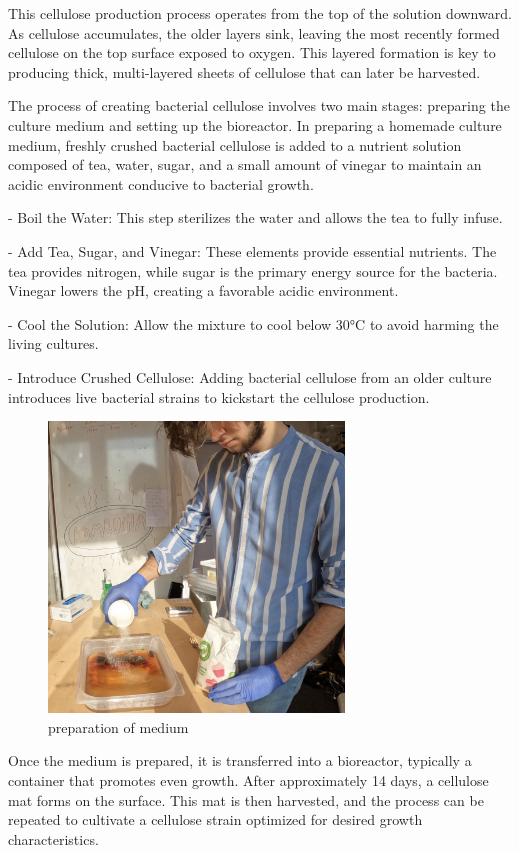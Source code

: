 This cellulose production process operates from the top of the solution downward. As cellulose accumulates, the older layers sink, leaving the most recently formed cellulose on the top surface exposed to oxygen. This layered formation is key to producing thick, multi-layered sheets of cellulose that can later be harvested.

The process of creating bacterial cellulose involves two main stages: preparing the culture medium and setting up the bioreactor. In preparing a homemade culture medium, freshly crushed bacterial cellulose is added to a nutrient solution composed of tea, water, sugar, and a small amount of vinegar to maintain an acidic environment conducive to bacterial growth.

\-- Boil the Water: This step sterilizes the water and allows the tea to fully infuse.

\-- Add Tea, Sugar, and Vinegar: These elements provide essential nutrients. The tea provides nitrogen, while sugar is the primary energy source for the bacteria. Vinegar lowers the pH, creating a favorable acidic environment.

\-- Cool the Solution: Allow the mixture to cool below 30°C to avoid harming the living cultures.

\-- Introduce Crushed Cellulose: Adding bacterial cellulose from an older culture introduces live bacterial strains to kickstart the cellulose production.

\begin{figure}[h]
    \centering
    \includegraphics[width=0.7\textwidth]{images/preparation.png}
    \caption{preparation of medium}
    \label{fig:manufactureperso2}
\end{figure} 
Once the medium is prepared, it is transferred into a bioreactor, typically a container that promotes even growth. After approximately 14 days, a cellulose mat forms on the surface. This mat is then harvested, and the process can be repeated to cultivate a cellulose strain optimized for desired growth characteristics.

